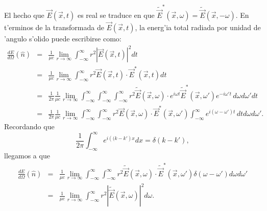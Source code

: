 El hecho que %
$ \vec{E}(\vec{x},t)$ es real se traduce en que 
$\tilde{\vec{E}}^*(\vec{x},\omega)=\tilde{\vec{E}}(\vec{x},-\omega)$. En t'erminos de la transformada de 
$ \vec{E}(\vec{x},t)$, la energ'ia total radiada por unidad de 'angulo s'olido puede escribirse como:
\begin{eqnarray}
\frac{dE}{d\Omega}(\hat{n}) &=&\frac{1}{\mu c}\lim_{r\to\infty} \int_{-\infty}^{\infty}r^2\left|\vec{E}(\vec{x},t)
\right|^2dt \label{dEdO0}\\
&=&\frac{1}{\mu c}\lim_{r\to\infty}\int_{-\infty}^{\infty}r^2\vec{E}(\vec{x},t)\cdot \vec{E}^*(\vec{x},t)dt\\
&=&\frac{1}{2\pi}\frac{1}{\mu c}\lim_{r\to\infty}\int_{-\infty}^{\infty}\int_{-\infty}^{\infty}\int_{-\infty}^{
\infty}r^2\tilde{\vec{E}}(\vec{x},\omega) \cdot e^{i\omega t}\tilde{\vec{E}}^\ast(\vec{x},\omega')e^{-i\omega' t}\,d\omega d\omega' dt\\
&=&\frac{1}{2\pi}\frac{1}{\mu c}\lim_{r\to\infty} \int_{-\infty}^{\infty}\int_{-\infty}^{\infty}r^2\vec{E}(\vec{x},\omega)\cdot \vec{E}^*(\vec{x},\omega')\int_{-\infty}^{\infty} e^{i(\omega-\omega')t}\,dtd\omega d\omega' .
\end{eqnarray}
Recordando que
\begin{equation}
\frac{1}{2\pi}\int_{-\infty}^{\infty }e^{i\left((  k-k' \right)  x}dx=
\delta\left(  k-k' \right),
\end{equation}
llegamos a que
\begin{eqnarray}
\frac{dE}{d\Omega}(\hat{n})
&=&\frac{1}{\mu c}\lim_{r\to\infty}\int_{-\infty}^{\infty}\int_{-\infty}^{\infty} r^2\tilde{\vec{E}}(\vec{x},\omega)\cdot\tilde{\vec{E}}^\ast(\vec{x},\omega') \delta (\omega-\omega')  d\omega d\omega'\\
&=&\frac{1}{\mu c}\lim_{r\to\infty}\int_{-\infty}^{\infty}r^2\left|\tilde{\vec{E}}(\vec{x},\omega)\right|^2 d\omega. \label{dedO1}
\end{eqnarray}

